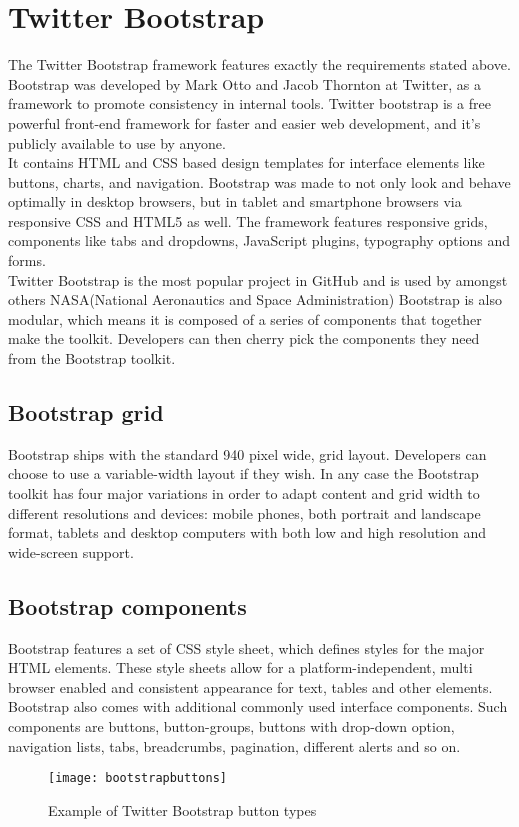 \section{Twitter Bootstrap}
The Twitter Bootstrap framework\citep{twitterbootstrap} features exactly the requirements stated above. Bootstrap was developed by Mark Otto and Jacob Thornton at Twitter, as a framework to promote consistency in internal tools\citep{buildingbootstrap}. Twitter bootstrap is a free powerful front-end framework for faster and easier web development, and it's publicly available to use by anyone.\\ It contains HTML and CSS based design templates for interface elements like buttons, charts, and navigation. Bootstrap was made to not only look and behave optimally in desktop browsers, but in tablet and smartphone browsers via responsive CSS and HTML5 as well. The framework features responsive grids, components like tabs and dropdowns, JavaScript plugins, typography options and forms. \\
Twitter Bootstrap is the most popular project in GitHub and is used by amongst others NASA(National Aeronautics and Space Administration)\citep{nasa}
Bootstrap is also modular, which means it is composed of a series of components that together make the toolkit. Developers can then cherry pick the components they need from the Bootstrap toolkit. \\

\subsection{Bootstrap grid}
Bootstrap ships with the standard 940 pixel wide, grid layout. Developers can choose to use a variable-width layout if they wish. In any case the Bootstrap toolkit has four major variations in order to adapt content and grid width to different resolutions and devices: mobile phones, both portrait and landscape format, tablets and desktop computers with both low and high resolution and wide-screen support.

\subsection{Bootstrap components}
Bootstrap features a set of CSS style sheet, which defines styles for the major HTML elements. These style sheets allow for a platform-independent, multi browser enabled and consistent appearance for text, tables and other elements. \\
Bootstrap also comes with additional commonly used interface components. Such components are buttons, button-groups, buttons with drop-down option, navigation lists, tabs, breadcrumbs, pagination, different alerts and so on. 
\begin{figure}[h!]
\centering
	\texttt{[image: bootstrapbuttons]}
\caption{Example of Twitter Bootstrap button types}
\label{bootstrapbutton}
\end{figure}


